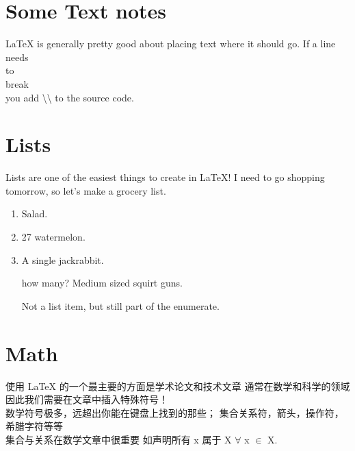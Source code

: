 \documentclass[12pt]{article}
\begin{document}
\section{Some Text notes}
\LaTeX \hspace{1pt} is generally pretty good about placing text where it should
go. If 
a line \\ needs \\ to \\ break \\ you add \textbackslash\textbackslash 
\hspace{1pt} to the source code. \\ 

\section{Lists}
Lists are one of the easiest things to create in \LaTeX! I need to go shopping
tomorrow, so let's make a grocery list.
\begin{enumerate} %
  \item Salad.
  \item 27 watermelon.
  \item A single jackrabbit.
  \item[how many?] Medium sized squirt guns.

  Not a list item, but still part of the enumerate.

\end{enumerate} %

\section{Math}

使用 \LaTeX \hspace{1pt} 的一个最主要的方面是学术论文和技术文章
通常在数学和科学的领域 
因此我们需要在文章中插入特殊符号！ \\

数学符号极多，远超出你能在键盘上找到的那些；
集合关系符，箭头，操作符，希腊字符等等 \\

集合与关系在数学文章中很重要
如声明所有 x 属于 X $\forall$ x $\in$ X. \\
\end{document}
